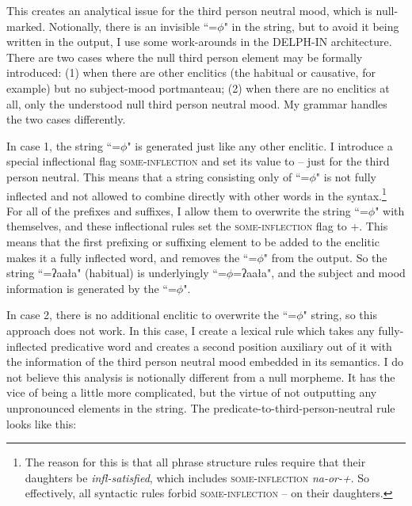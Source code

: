 This creates an analytical issue for the third person neutral mood, which is null-marked. Notionally, there is an invisible ``=$\phi$" in the string, but to avoid it being written in the output, I use some work-arounds in the DELPH-IN architecture. There are two cases where the null third person element may be formally introduced: (1) when there are other enclitics (the habitual or causative, for example) but no subject-mood portmanteau; (2) when there are no enclitics at all, only the understood null third person neutral mood. My grammar handles the two cases differently.

In case 1, the string ``=$\phi$" is generated just like any other enclitic. I introduce a special inflectional flag \citep{goodman2013} \textsc{some-inflection} and set its value to -- just for the third person neutral. This means that a string consisting only of ``=$\phi$" is not fully inflected and not allowed to combine directly with other words in the syntax.\footnote{The reason for this is that all phrase structure rules require that their daughters be \textit{infl-satisfied}, which includes \textsc{some-inflection} \textit{na-or-+}. So effectively, all syntactic rules forbid \textsc{some-inflection} -- on their daughters.} For all of the prefixes and suffixes, I allow them to overwrite the string ``=$\phi$" with themselves, and these inflectional rules set the \textsc{some-inflection} flag to +. This means that the first prefixing or suffixing element to be added to the enclitic makes it a fully inflected word, and removes the ``=$\phi$" from the output. So the string ``=ʔaała" (habitual) is underlyingly ``=$\phi$=ʔaała", and the subject and mood information is generated by the ``=$\phi$".

In case 2, there is no additional enclitic to overwrite the ``=$\phi$" string, so this approach does not work. In this case, I create a lexical rule which takes any fully-inflected predicative word and creates a second position auxiliary out of it with the information of the third person neutral mood embedded in its semantics. I do not believe this analysis is notionally different from a null morpheme. It has the vice of being a little more complicated, but the virtue of not outputting any unpronounced elements in the string. The predicate-to-third-person-neutral rule looks like this:

